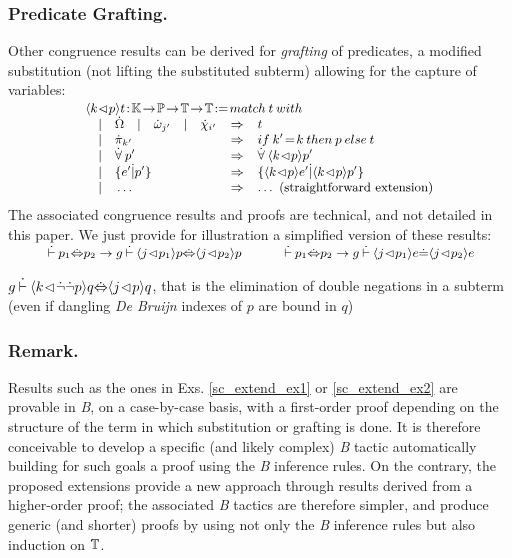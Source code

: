 \documentclass{llncs}
\begin{document}
\subsubsection{Predicate Grafting.} Other congruence results can be derived for 
\emph{grafting} of predicates, a modified substitution (not lifting the substituted subterm) 
allowing for the capture of variables:
\[
\small
\begin{array}{lcl}
\vspace{-16pt}\\
\multicolumn{3}{l}
{\Bgraftprd{k}{p}{t}\!:\!\Bnamp\!\to\!\Bprd\!\to\!\Btrm\!\to\!\Btrm\!:=\!match\:t\:with}\\
\quad | \quad \ebig\quad|\quad\ebie{j'}\quad|\quad\evar{i'} & \Rightarrow & t\\
\quad | \quad \ppvr{k'} & \Rightarrow & if\:k'\!=\!k\:then\:p\:else\:t\\
\quad | \quad \pfor p' & \Rightarrow & \pfor \Bgraftprd{k}{p}{p'}\\
\quad | \quad \ecmp{e'}{p'} & \Rightarrow & \ecmp{\Bgraftprd{k}{p}{e'}}
                                               {\Bgraftprd{k}{p}{p'}}\\
\quad | \quad \ldots & \Rightarrow & \ldots \text{ (straightforward extension)}\\
\end{array}
\]
The associated congruence results and proofs are technical, and not detailed in this paper. We 
just provide for illustration a simplified version of these results:
\[
\small
\begin{array}{ll}
\vspace{-16pt}\\
\Binf p_1\piff p_2 \to g\Binf \Bgraftprd{j}{p_1}{p} \piff \Bgraftprd{j}{p_2}{p}
\quad & \quad
\Binf p_1\piff p_2 \to g\Binf \Bgraftprd{j}{p_1}{e} \pequ \Bgraftprd{j}{p_2}{e}
\end{array}
\]

\begin{example}\label{sc_extend_ex2}\small
$g\:\dot{\vdash}\:\langle{k}\!\lhd\!{\dot{\lnot}\dot{\lnot} p}\rangle{q}\dot{\Leftrightarrow}\langle{j}\!\lhd\!{p}\rangle{q}$, 
that is the elimination of double negations in a subterm (even if dangling \emph{De Bruijn} 
indexes of $p$ are bound in $q$)
\end{example}

\subsubsection{Remark.} Results such as the ones in Exs. \ref{sc_extend_ex1} or 
\ref{sc_extend_ex2} are provable in \emph{B}, on a case-by-case basis, with a first-order 
proof depending on the structure of the term in which substitution or grafting is done. It is 
therefore conceivable to develop a specific (and likely complex) \emph{B} tactic automatically 
building for such goals a proof using the \emph{B} inference rules. On the contrary, the 
proposed extensions provide a new approach through results derived from a higher-order proof; 
the associated \emph{B} tactics are therefore simpler, and produce generic (and shorter) 
proofs by using not only the \emph{B} inference rules but also induction on $\mathbb{T}$.
\end{document}
